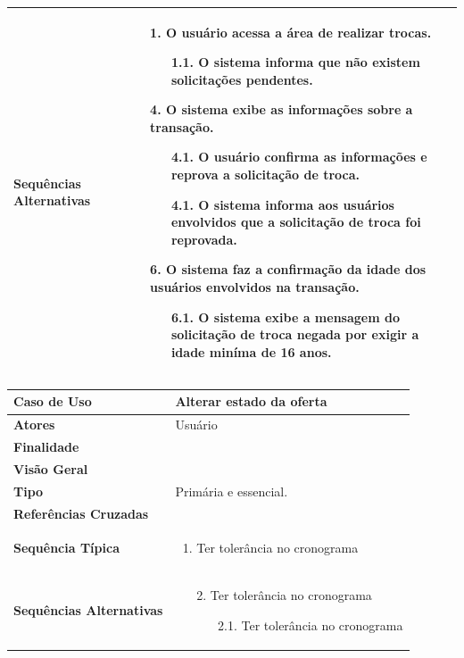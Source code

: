 \documentclass[a4paper,11pt]{article}
\begin{document}
\begin{table}[H]
\begin{tabularx}{\textwidth}{|l|X|}
			\textbf{Sequências Alternativas} & 
			\begin{itemize}
				\item[1.] O usuário acessa a área de realizar trocas.
				\begin{itemize}
					\item[1.1.] O sistema informa que não existem solicitações pendentes.
				\end{itemize}
				\item[4.] O sistema exibe as informações sobre a transação.
				\begin{itemize}
					\item[4.1.] O usuário confirma as informações e reprova a solicitação de troca.	
					\item[4.1.]O sistema informa aos usuários envolvidos que a solicitação de troca foi reprovada.
				\end{itemize}
				\item[6.] O sistema faz a confirmação da idade dos usuários envolvidos na transação.
				\begin{itemize}
					\item[6.1.] O sistema exibe a mensagem do solicitação de troca negada por exigir a idade miníma de 16 anos.
				\end{itemize}
			\end{itemize} \\ \hline
		\end{tabularx}
\end{table}

\begin{table}[H]
		\begin{tabularx}{\textwidth}{|l|X|}
		\hline
			\textbf{Caso de Uso} &  Alterar estado da oferta \\ \hline
			\textbf{Atores} &  Usuário  \\ \hline
			\textbf{Finalidade} &   \\ \hline
			\textbf{Visão Geral} &  \\ \hline
			\textbf{Tipo} & Primária e essencial. \\ \hline
			\textbf{Referências Cruzadas} &  \\ \hline
			\textbf{Sequência Típica} & 
			\begin{enumerate}
			\item Ter tolerância no cronograma
			\end{enumerate} \\ \hline
			
			\textbf{Sequências Alternativas} & 
			\begin{itemize}
				\item[2.] Ter tolerância no cronograma
				\begin{itemize}
					\item[2.1.] Ter tolerância no cronograma
				\end{itemize}
			\end{itemize} \\ \hline
		\end{tabularx}
\end{table}
\end{document}
